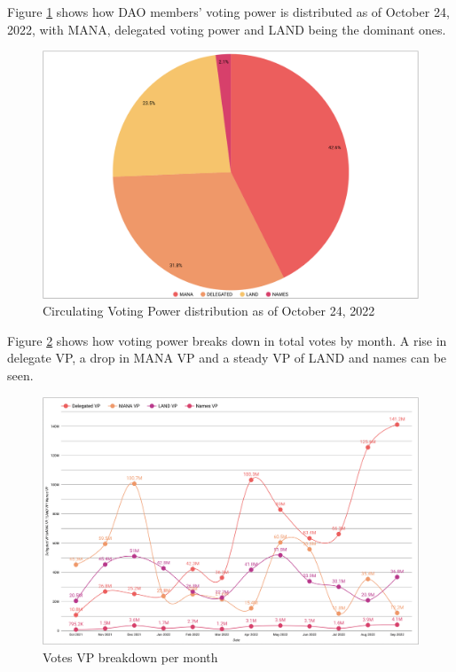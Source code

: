 \documentclass[MSE,Master,english]{twbook}%
\begin{document}
Figure \ref{fig:vp_distribution} shows how DAO members' voting power is distributed as of October 24, 2022, with MANA, delegated voting power and LAND being the dominant ones.
\begin{figure}[H]
  \centering
  \includegraphics[width=\textwidth]{metrics/vp_distribution.png}
  \caption{Circulating Voting Power distribution as of October 24, 2022}
  \label{fig:vp_distribution}
\end{figure}

Figure \ref{fig:votes_vp} shows how voting power breaks down in total votes by month. A rise in delegate VP, a drop in MANA VP and a steady VP of LAND and names can be seen.
\begin{figure}[H]
  \centering
  \includegraphics[width=\textwidth]{metrics/votes_breakdown.png}
  \caption{Votes VP breakdown per month}
  \label{fig:votes_vp}
\end{figure}
\end{document}

